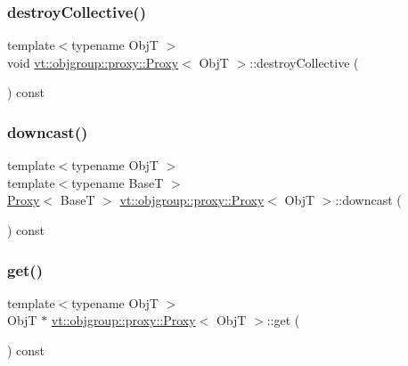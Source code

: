 \mbox{\label{structvt_1_1objgroup_1_1proxy_1_1_proxy_a6758c7979d1f69722449cb78f998cbf1}} 
\subsubsection{\texorpdfstring{destroy\+Collective()}{destroyCollective()}}
{\footnotesize\ttfamily template$<$typename ObjT $>$ \\
void \hyperlink{structvt_1_1objgroup_1_1proxy_1_1_proxy}{vt\+::objgroup\+::proxy\+::\+Proxy}$<$ ObjT $>$\+::destroy\+Collective (\begin{DoxyParamCaption}{ }\end{DoxyParamCaption}) const}

\mbox{\label{structvt_1_1objgroup_1_1proxy_1_1_proxy_ae672794dc83491200d7f6e794865a6bc}} 
\subsubsection{\texorpdfstring{downcast()}{downcast()}}
{\footnotesize\ttfamily template$<$typename ObjT $>$ \\
template$<$typename BaseT $>$ \\
\hyperlink{structvt_1_1objgroup_1_1proxy_1_1_proxy}{Proxy}$<$ BaseT $>$ \hyperlink{structvt_1_1objgroup_1_1proxy_1_1_proxy}{vt\+::objgroup\+::proxy\+::\+Proxy}$<$ ObjT $>$\+::downcast (\begin{DoxyParamCaption}{ }\end{DoxyParamCaption}) const}

\mbox{\label{structvt_1_1objgroup_1_1proxy_1_1_proxy_a62eef779c097c8398e249827e4ad7c6a}} 
\subsubsection{\texorpdfstring{get()}{get()}}
{\footnotesize\ttfamily template$<$typename ObjT $>$ \\
ObjT $\ast$ \hyperlink{structvt_1_1objgroup_1_1proxy_1_1_proxy}{vt\+::objgroup\+::proxy\+::\+Proxy}$<$ ObjT $>$\+::get (\begin{DoxyParamCaption}{ }\end{DoxyParamCaption}) const}

